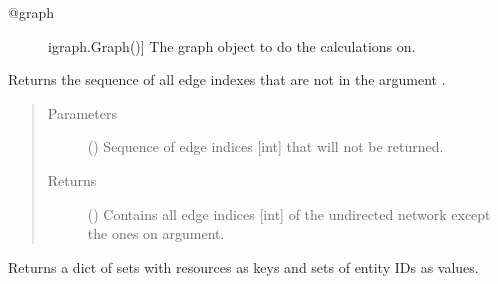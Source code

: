 \documentclass[letterpaper,10pt,english]{sphinxmanual}
\begin{document}
\begin{fulllineitems}
\begin{fulllineitems}
\begin{description}
\item[{@graph}] \leavevmode{[}igraph.Graph(){]}
The graph object to do the calculations on.

\end{description}

\end{fulllineitems}


\begin{fulllineitems}
\label{\detokenize{reference:pypath.main.PyPath.edges_ptms}}
\end{fulllineitems}


\begin{fulllineitems}
\label{\detokenize{reference:pypath.main.PyPath.edgeseq_inverse}}
Returns the sequence of all edge indexes that are not in
the argument .
\begin{quote}\begin{description}
\item[{Parameters}] \leavevmode
{} () \textendash{} Sequence of edge indices {[}int{]} that will not be returned.

\item[{Returns}] \leavevmode
() \textendash{} Contains all edge indices {[}int{]} of the
undirected network except the ones on  argument.

\end{description}\end{quote}

\end{fulllineitems}


\begin{fulllineitems}
\label{\detokenize{reference:pypath.main.PyPath.entities_by_resources}}
Returns a dict of sets with resources as keys and sets of entity IDs
as values.


\end{fulllineitems}
\end{fulllineitems}
\end{document}
